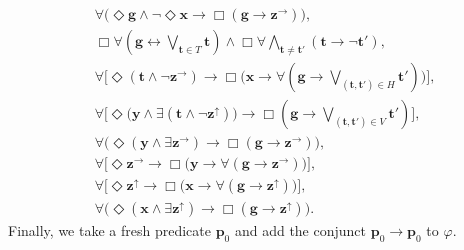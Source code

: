 \documentclass{lmcs} %
\theoremstyle{plain}\newtheorem{satz}[thm]{Satz} %
\newcommand{\bbvarup}{\Zvar^\uparrow}
\newcommand{\bbvarright}{\Zvar^\to}
\newcommand{\fform}[1]{\boldsymbol{#1}}
\newcommand{\pvar}{\fform{p}}
\newcommand{\gvar}{\fform{g}}
\newcommand{\tvar}{\fform{t}}
\newcommand{\xvar}{\fform{x}}
\newcommand{\yvar}{\fform{y}}
\newcommand{\Zvar}{\fform{z}}
\newcommand{\Bv}{\forall}
\newcommand{\Bh}{\Box}
\newcommand{\Dv}{\exists}
\newcommand{\Dh}{\Diamond}
\begin{document}
	\begin{align*}
		&\Bv \bigl(\Dh \gvar \wedge \neg \Dh \xvar \rightarrow \Bh (\gvar \rightarrow \bbvarright)\bigr),\\
		& \Bh\Bv (\gvar \leftrightarrow \bigvee_{\tvar\in T}\tvar) \land
		    \Bh\Bv \bigwedge_{\tvar\not=\tvar'}(\tvar \rightarrow \neg \tvar'),\\
		&\Bv \bigl[\Dh (\tvar \wedge \neg \bbvarright) \rightarrow \Bh \bigl(\xvar\rightarrow \Bv (\gvar \rightarrow \bigvee_{(\tvar,\tvar')\in H} \tvar')\bigr)\bigr],\\
		&
		\Bv \bigl[\Dh \bigl(\yvar \wedge \Dv (\tvar\wedge \neg \bbvarup)\bigr) \rightarrow \Bh (\gvar \rightarrow \bigvee_{(\tvar,\tvar')\in V} \tvar')\bigr],
		\\
		&\Bv \bigl(\Dh (\yvar \wedge \Dv \Zvar^{\rightarrow}) \rightarrow \Bh (\gvar \rightarrow \bbvarright)\bigr),\\
		&\Bv \bigl[\Dh\bbvarright \rightarrow \Bh \bigl(\yvar \rightarrow \Bv (\gvar \rightarrow \bbvarright)\bigr)\bigr],\\
		& \Bv\bigl[\Dh\bbvarup\to\Bh\bigl(\xvar\to\Bv(\gvar\to\bbvarup)\bigr)\bigr],\\
		& \Bv\bigl(\Dh(\xvar\land\Dv\bbvarup)\to\Bh(\gvar\to\bbvarup)\bigr).
	\end{align*}
	Finally, we take a fresh predicate $\pvar_0$ and add the conjunct $\pvar_0\to\pvar_0$ to $\varphi$.
	
	
	
\end{document}
